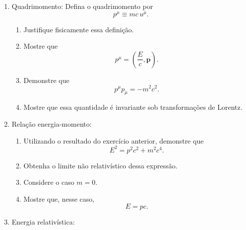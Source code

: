 \begin{enumerate}
\begin{enumerate}
                  \item Interprete geometricamente o resultado obtido.
            \end{enumerate}

      \item Quadrimomento: Defina o quadrimomento por
            $$
                  p^\mu\equiv mc\,u^\mu.
            $$

            \begin{enumerate}
                  \item Justifique fisicamente essa definição.

                  \item Mostre que
                        $$
                              p^\mu=
                              \left(
                              \frac{E}{c},
                              \mathbf p
                              \right).
                        $$

                  \item Demonstre que
                        $$
                              p^\mu p_\mu=-m^2c^2.
                        $$

                  \item Mostre que essa quantidade é invariante sob transformações de
                        Lorentz.
            \end{enumerate}

      \item Relação energia-momento:

            \begin{enumerate}
                  \item Utilizando o resultado do exercício anterior, demonstre que
                        $$
                              E^2=p^2c^2+m^2c^4.
                        $$

                  \item Obtenha o limite não relativístico dessa expressão.

                  \item Considere o caso $m=0$.

                  \item Mostre que, nesse caso,
                        $$
                              E=pc.
                        $$
            \end{enumerate}

      \item Energia relativística:


\end{enumerate}
